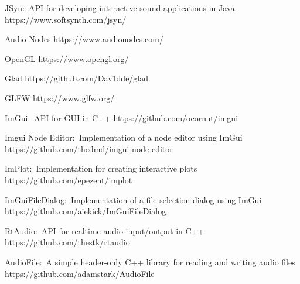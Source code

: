 \documentclass[conference]{IEEEtran}
\begin{document}
\begin{thebibliography}{1}
JSyn:~API for developing interactive sound applications in Java https://www.softsynth.com/jsyn/

Audio Nodes https://www.audionodes.com/

OpenGL https://www.opengl.org/

Glad https://github.com/Dav1dde/glad

GLFW https://www.glfw.org/

ImGui:~API for GUI in C++ https://github.com/ocornut/imgui

Imgui Node Editor:~Implementation of a node editor using ImGui https://github.com/thedmd/imgui-node-editor

ImPlot:~Implementation for creating interactive plots https://github.com/epezent/implot

ImGuiFileDialog:~Implementation of a file selection dialog using ImGui https://github.com/aiekick/ImGuiFileDialog

RtAudio:~API for realtime audio input/output in C++ https://github.com/thestk/rtaudio

AudioFile:~A simple header-only C++ library for reading and writing audio files https://github.com/adamstark/AudioFile

\end{thebibliography}
\end{document}
